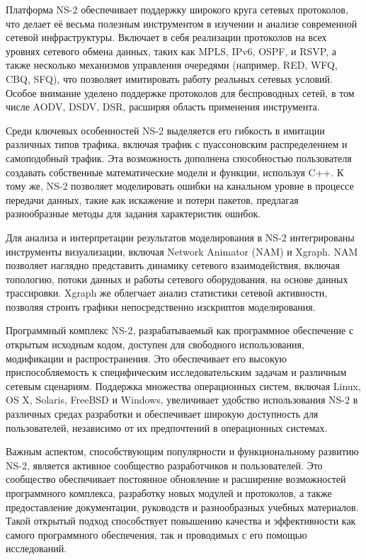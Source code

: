 Платформа NS-2 обеспечивает поддержку широкого круга сетевых протоколов, что делает её весьма полезным инструментом в изучении и анализе современной сетевой инфраструктуры. Включает в себя реализации протоколов на всех уровнях сетевого обмена данных, таких как MPLS, IPv6, OSPF, и RSVP, а также несколько механизмов управления очередями (например, RED, WFQ, CBQ, SFQ), что позволяет имитировать работу реальных сетевых условий. Особое внимание уделено поддержке протоколов для беспроводных сетей, в том числе AODV, DSDV, DSR, расширяя область применения инструмента.

Среди ключевых особенностей NS-2 выделяется его гибкость в имитации различных типов трафика, включая трафик с пуассоновским распределением и самоподобный трафик. Эта возможность дополнена способностью пользователя создавать собственные математические модели и функции, используя C++. К тому же, NS-2 позволяет моделировать ошибки на канальном уровне в процессе передачи данных, такие как искажение и потери пакетов, предлагая разнообразные методы для задания характеристик ошибок.

Для анализа и интерпретации результатов моделирования в NS-2 интегрированы инструменты визуализации, включая Network Animator (NAM) и Xgraph. NAM позволяет наглядно представить динамику сетевого взаимодействия, включая топологию, потоки данных и работы сетевого оборудования, на основе данных трассировки. Xgraph же облегчает анализ статистики сетевой активности, позволяя строить графики непосредственно изскриптов моделирования.

Программный комплекс NS-2, разрабатываемый как программное обеспечение с открытым исходным кодом, доступен для свободного использования, модификации и распространения. Это обеспечивает его высокую приспособляемость к специфическим исследовательским задачам и различным сетевым сценариям. Поддержка множества операционных систем, включая Linux, OS X, Solaris, FreeBSD и Windows, увеличивает удобство использования NS-2 в различных средах разработки и обеспечивает широкую доступность для пользователей, независимо от их предпочтений в операционных системах.

Важным аспектом, способствующим популярности и функциональному развитию NS-2, является активное сообщество разработчиков и пользователей. Это сообщество обеспечивает постоянное обновление и расширение возможностей программного комплекса, разработку новых модулей и протоколов, а также предоставление документации, руководств и разнообразных учебных материалов. Такой открытый подход способствует повышению качества и эффективности как самого программного обеспечения, так и проводимых с его помощью исследований.

